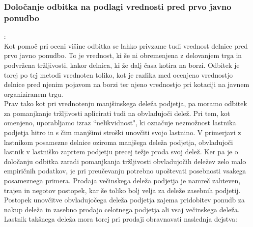\documentclass[12pt,a4paper]{amsart}
\theoremstyle{definition} %
\theoremstyle{plain} %
\begin{document}
\subsubsection{Določanje odbitka na podlagi vrednosti pred prvo javno ponudbo}:\\
Kot pomoč pri oceni višine odbitka se lahko privzame tudi vrednost delnice pred prvo javno ponudbo. To je vrednost, ki še ni obremenjena z delovanjem trga in podvržena tržljivosti, kakor delnica, ki že dalj časa kotira na borzi. Odbitek je torej po tej metodi vrednoten toliko, kot je razlika med ocenjeno vrednostjo delnice pred njenim pojavom na borzi ter njeno vrednostjo pri kotaciji na javnem organiziranem trgu.  \\


Prav tako kot pri vrednotenju manjšinskega deleža podjetja, pa moramo odbitek za pomanjkanje tržljivosti aplicirati tudi na obvladujoči delež. Pri tem, kot omenjeno, uporabljamo izraz ``nelikvidnost", ki označuje nezmožnost lastnika podjetja hitro in s čim manjšimi stroški unovčiti svojo lastnino. V primerjavi z lastnikom posamezne delnice oziroma manjšega deleža podjetja, obvladujoči lastnik v lastniško zaprtem podjetju precej težje proda svoj delež. Ker pa je o določanju odbitka zaradi pomanjkanja tržljivosti obvladujočih deležev zelo malo empiričnih podatkov, je pri preučevanju potrebno upoštevati posebnosti vsakega posameznega primera.%
Prodaja večinskega deleža podjetja je namreč zahteven, trajen in negotov postopek, kar še toliko bolj velja za deleže zasebnih podjetij. Postopek unovčitve obvladujočega deleža podjetja zajema pridobitev ponudb za nakup deleža in zasebno prodajo celotnega podjetja ali vsaj večinskega deleža. Lastnik takšnega deleža mora torej pri prodaji obravnavati naslednja dejstva:
\end{document}
